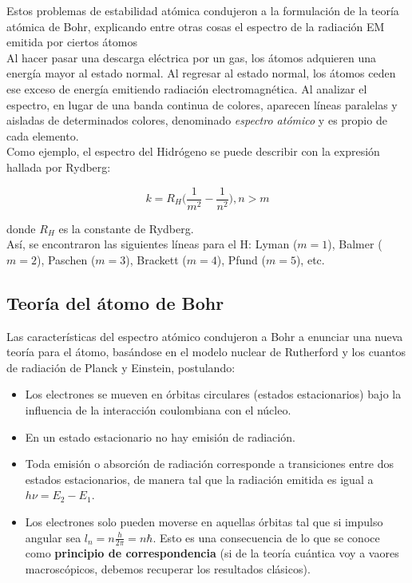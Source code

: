 \documentclass[a4paper]{article}
\begin{document}
Estos problemas de estabilidad at\'omica condujeron a la formulaci\'on de la teor\'ia at\'omica de Bohr, explicando entre otras cosas el espectro de la radiaci\'on EM emitida por ciertos \'atomos\\

Al hacer pasar una descarga el\'ectrica por un gas, los \'atomos adquieren una energ\'ia mayor al estado normal. Al regresar al estado normal, los \'atomos ceden ese exceso de energ\'ia emitiendo radiaci\'on electromagn\'etica. Al analizar el espectro, en lugar de una banda continua de colores, aparecen l\'ineas paralelas y aisladas de determinados colores, denominado \textit{espectro at\'omico} y es propio de cada elemento.\\

Como ejemplo, el espectro del Hidr\'ogeno se puede describir con la expresi\'on hallada por Rydberg:

$$k = R_{H}\bigg( \frac{1}{m^{2}} - \frac{1}{n^{2}}\bigg), n > m$$

donde $R_{H}$ es la constante de Rydberg.\\

As\'i, se encontraron las siguientes l\'ineas para el H: Lyman ($m = 1$), Balmer ($m = 2$), Paschen ($m = 3$), Brackett ($m = 4$), Pfund ($m = 5$), etc.

\subsection{Teor\'ia del \'atomo de Bohr}

Las caracter\'isticas del espectro at\'omico condujeron a Bohr a enunciar una nueva teor\'ia para el \'atomo, bas\'andose en el modelo nuclear de Rutherford y los cuantos de radiaci\'on de Planck y Einstein, postulando:

\begin{itemize}
\item Los electrones se mueven en \'orbitas circulares (estados estacionarios) bajo la influencia de la interacci\'on coulombiana con el n\'ucleo.
\item En un estado estacionario no hay emisi\'on de radiaci\'on.
\item Toda emisi\'on o absorci\'on de radiaci\'on corresponde a transiciones entre dos estados estacionarios, de manera tal que la radiaci\'on emitida es igual a $h\nu = E_{2} - E_{1}$.
\item Los electrones solo pueden moverse en aquellas \'orbitas tal que si impulso angular sea $l_{n} = n \frac{h}{2\pi} = n\hbar$. Esto es una consecuencia de lo que se conoce como \textbf{principio de correspondencia} (si de la teor\'ia cu\'antica voy a vaores macrosc\'opicos, debemos recuperar los resultados cl\'asicos).
\end{itemize}
\end{document}
